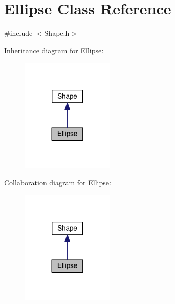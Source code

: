 \hypertarget{class_ellipse}{}\section{Ellipse Class Reference}
\label{class_ellipse}


{\ttfamily \#include $<$Shape.\+h$>$}



Inheritance diagram for Ellipse\+:\nopagebreak
\begin{figure}[H]
\begin{center}
\leavevmode
\includegraphics[width=125pt]{dd/ddc/class_ellipse__inherit__graph}
\end{center}
\end{figure}


Collaboration diagram for Ellipse\+:\nopagebreak
\begin{figure}[H]
\begin{center}
\leavevmode
\includegraphics[width=125pt]{d4/df4/class_ellipse__coll__graph}
\end{center}
\end{figure}
